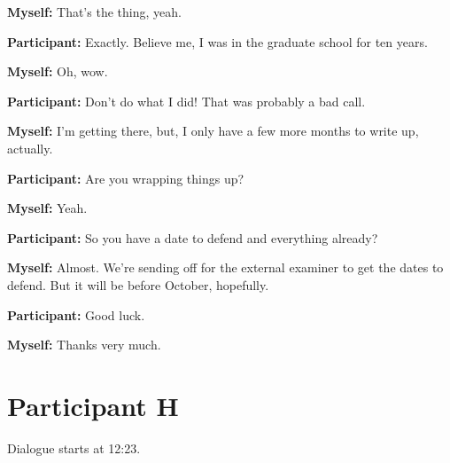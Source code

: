 \documentclass[11pt]{report}
\begin{document}
\begin{linenumbers}
\textbf{Myself:} That's the thing, yeah.

\textbf{Participant:} Exactly. Believe me, I was in the graduate school for ten years.

\textbf{Myself:} Oh, wow.

\textbf{Participant:} Don't do what I did! That was probably a bad call.

\textbf{Myself:} I'm getting there, but, I only have a few more months to write up, actually.

\textbf{Participant:} Are you wrapping things up?

\textbf{Myself:} Yeah.

\textbf{Participant:} So you have a date to defend and everything already?

\textbf{Myself:} Almost. We're sending off for the external examiner to get the dates to defend. But it will be before October, hopefully.

\textbf{Participant:} Good luck.

\textbf{Myself:} Thanks very much.

\end{linenumbers}
\resetlinenumber[1]

\section{Participant H}
Dialogue starts at 12:23.
\end{document}

